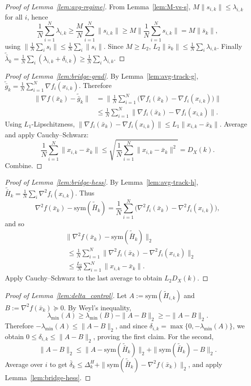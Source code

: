 \documentclass[10pt,twocolumn,letterpaper]{article}
\theoremstyle{compact}
\theoremstyle{compactremark}
\begin{document}
\begin{proof}[Proof of Lemma~\ref{lem:avg-regime}]
From Lemma~\ref{lem:M-vs-s}, $M\|s_{i,k}\|\le \lambda_{i,k}$ for all $i$, hence
\[
\frac1N\sum_{i=1}^N\lambda_{i,k}\ge \frac{M}{N}\sum_{i=1}^N\|s_{i,k}\|\ge M\Big\|\frac1N\sum_{i=1}^N s_{i,k}\Big\|=M\|\bar s_k\|,
\]
using $\|\frac1N\sum_i s_i\|\le \frac1N\sum_i\|s_i\|$.
Since $M\ge L_2$, $L_2\|\bar s_k\|\le \frac1N\sum_i\lambda_{i,k}$.
Finally $\tilde{\bar\lambda}_k=\frac1N\sum_i(\lambda_{i,k}+\delta_{i,k})\ge \frac1N\sum_i\lambda_{i,k}$.
\end{proof}

\begin{proof}[Proof of Lemma~\ref{lem:bridge-grad}]
By Lemma~\ref{lem:avg-track-g}, $\tilde{\bar g}_k=\frac1N\sum_{i=1}^N\nabla f_i(x_{i,k})$.
Therefore
\begin{align*}
\|\nabla f(\bar x_k)\!-\!\tilde{\bar g}_k\|
&=\Big\|\tfrac1N\textstyle\sum_{i=1}^N\!\big(\nabla f_i(\bar x_k)\!-\!\nabla f_i(x_{i,k})\big)\Big\|\\
&\le \tfrac1N\textstyle\sum_{i=1}^N \|\nabla f_i(\bar x_k)\!-\!\nabla f_i(x_{i,k})\|.
\end{align*}
Using $L_1$-Lipschitzness, $\|\nabla f_i(\bar x_k)-\nabla f_i(x_{i,k})\|\le L_1\|x_{i,k}-\bar x_k\|$.
Average and apply Cauchy--Schwarz:
\[
\frac1N\sum_{i=1}^N\|x_{i,k}-\bar x_k\|
\le \sqrt{\frac1N\sum_{i=1}^N\|x_{i,k}-\bar x_k\|^2}=D_X(k).
\]
Combine.
\end{proof}

\begin{proof}[Proof of Lemma~\ref{lem:bridge-hess}]
By Lemma~\ref{lem:avg-track-h}, $\tilde{\bar H}_k=\frac1N\sum_i \nabla^2 f_i(x_{i,k})$.
Thus
\[
\nabla^2 f(\bar x_k)-\mathrm{sym}(\tilde{\bar H}_k)
=\frac1N\sum_{i=1}^N\big(\nabla^2 f_i(\bar x_k)-\nabla^2 f_i(x_{i,k})\big),
\]
and so
\begin{align*}
&\|\nabla^2 f(\bar x_k)\!-\!\mathrm{sym}(\tilde{\bar H}_k)\|_2\\
&\;\le \tfrac1N\textstyle\sum_{i=1}^N\|\nabla^2 f_i(\bar x_k)\!-\!\nabla^2 f_i(x_{i,k})\|_2\\
&\;\le \tfrac{L_2}{N}\textstyle\sum_{i=1}^N\|x_{i,k}\!-\!\bar x_k\|.
\end{align*}
Apply Cauchy--Schwarz to the last average to obtain $L_2 D_X(k)$.
\end{proof}

\begin{proof}[Proof of Lemma~\ref{lem:delta_control}]
Let $A:=\mathrm{sym}(\tilde H_{i,k})$ and $B:=\nabla^2 f(\bar x_k)\succeq0$.
By Weyl's inequality,
\[
\lambda_{\min}(A)\ge \lambda_{\min}(B)-\|A-B\|_2\ge -\|A-B\|_2.
\]
Therefore $-\lambda_{\min}(A)\le \|A-B\|_2$, and since $\delta_{i,k}=\max\{0,-\lambda_{\min}(A)\}$,
we obtain $0\le \delta_{i,k}\le \|A-B\|_2$, proving the first claim.
For the second,
\[
\|A-B\|_2\le \|A-\mathrm{sym}(\tilde{\bar H}_k)\|_2+\|\mathrm{sym}(\tilde{\bar H}_k)-B\|_2.
\]
Average over $i$ to get $\bar\delta_k\le \Delta_k^H+\|\mathrm{sym}(\tilde{\bar H}_k)-\nabla^2 f(\bar x_k)\|_2$,
and apply Lemma~\ref{lem:bridge-hess}.
\end{proof}
\end{document}
